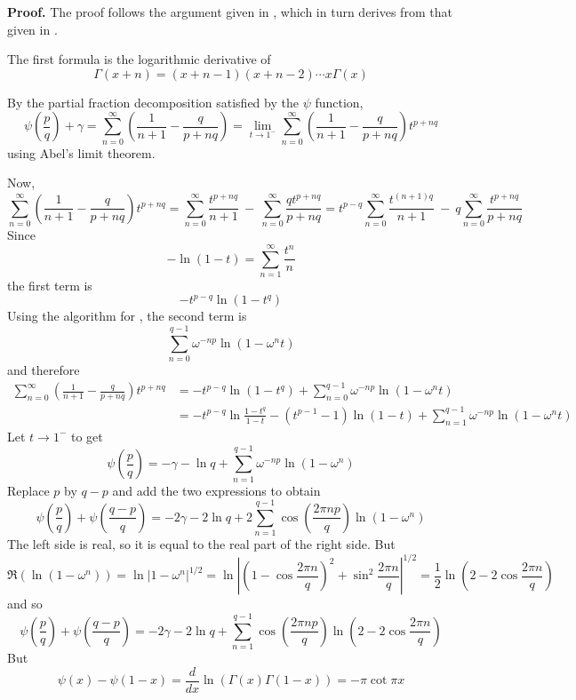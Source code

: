 \documentclass[12pt]{article}
\begin{document}
\textbf{Proof.}
The proof follows the argument given in \cite{bib:andrews}, which in turn derives from that given in \cite{bib:jensen}.

The first formula is the logarithmic derivative of
\[\Gamma(x+n)=(x+n-1)(x+n-2)\cdots x\Gamma(x)\]

By the partial fraction decomposition satisfied by the $\psi$ function,
\[\psi\left(\frac{p}{q}\right)+\gamma=\sum_{n=0}^{\infty}\left(\frac{1}{n+1}-\frac{q}{p+nq}\right)=
\lim_{t\to 1^-}\sum_{n=0}^{\infty}\left(\frac{1}{n+1}-\frac{q}{p+nq}\right)t^{p+nq}\]
using Abel's limit theorem.

Now,
\[\sum_{n=0}^{\infty}\left(\frac{1}{n+1}-\frac{q}{p+nq}\right)t^{p+nq}=
\sum_{n=0}^{\infty}\frac{t^{p+nq}}{n+1}\ -\ \sum_{n=0}^{\infty}\frac{qt^{p+nq}}{p+nq}=
t^{p-q}\sum_{n=0}^{\infty}\frac{t^{(n+1)q}}{n+1}\ -\ q\sum_{n=0}^{\infty}\frac{t^{p+nq}}{p+nq}\]
Since
\[-\ln(1-t)=\sum_{n=1}^{\infty} \frac{t^n}{n}\]
the first term is
\[-t^{p-q}\ln(1-t^q)\]
Using the algorithm for , the second term is
\[\sum_{n=0}^{q-1}\omega^{-np}\ln(1-\omega^n t)\]
and therefore
\begin{align*}\sum_{n=0}^{\infty}\left(\frac{1}{n+1}-\frac{q}{p+nq}\right)t^{p+nq}&=-t^{p-q}\ln(1-t^q)+\sum_{n=0}^{q-1}\omega^{-np}\ln(1-\omega^n t)\\
&=-t^{p-q}\ln\frac{1-t^q}{1-t}-(t^{p-1}-1)\ln(1-t)+\sum_{n=1}^{q-1}\omega^{-np}\ln(1-\omega^n t)
\end{align*}
Let $t\to 1^-$ to get
\[\psi\left(\frac{p}{q}\right)=-\gamma-\ln q+\sum_{n=1}^{q-1}\omega^{-np}\ln(1-\omega^n)\]
Replace $p$ by $q-p$ and add the two expressions to obtain
\begin{equation*}\psi\left(\frac{p}{q}\right)+\psi\left(\frac{q-p}{q}\right)=-2\gamma-2\ln q+2\sum_{n=1}^{q-1}\cos\left(\frac{2\pi n p}{q}\right)\ln(1-\omega^n)
\end{equation*}
The left side is real, so it is equal to the real part of the right side. But
\[\Re(\ln(1-\omega^n))=\ln\lvert 1-\omega^n\rvert^{1/2}=\ln\left\lvert \left(1-\cos\frac{2\pi n}{q}\right)^2+\sin^2\frac{2\pi n}{q}\right\rvert^{1/2}=\frac{1}{2}\ln\left(2-2\cos\frac{2\pi n}{q}\right)
\]
and so
\begin{equation}\label{eqn:one}\psi\left(\frac{p}{q}\right)+\psi\left(\frac{q-p}{q}\right)=-2\gamma-2\ln q+\sum_{n=1}^{q-1}\cos\left(\frac{2\pi n 
p}{q}\right)\ln(2-2\cos\frac{2\pi n}{q})\end{equation}
But
\[\psi(x)-\psi(1-x)=\frac{d}{dx}\ln(\Gamma(x)\Gamma(1-x))=-\pi\cot\pi x\]
\end{document}
